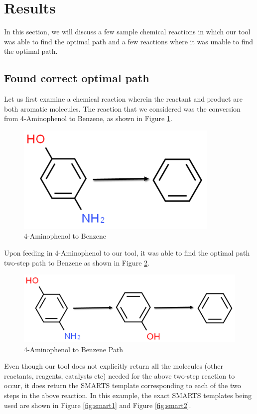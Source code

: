 \documentclass[preprint,12pt]{elsarticle}
\begin{document}
\section{Results}
\label{S:2}

In this section, we will discuss a few sample chemical reactions in which our tool was able to find the optimal path and a few reactions where it was unable to find the optimal path. 

\subsection{Found correct optimal path}

Let us first examine a chemical reaction wherein the reactant and product are both aromatic molecules. The reaction that we considered was the conversion from 4-Aminophenol to Benzene, as shown in Figure \ref{fig:aminophenol_to_benzene}.

\begin{figure}[h]
\centering\includegraphics[width=0.4\linewidth]{aminophenol_to_benzene}
\caption{4-Aminophenol to Benzene}
\label{fig:aminophenol_to_benzene}
\end{figure}

Upon feeding in 4-Aminophenol to our tool, it was able to find the optimal path two-step path to Benzene as shown in Figure \ref{fig:aminophenol_to_benzene_path}.

\begin{figure}[h]
\centering\includegraphics[width=0.6\linewidth]{aminophenol_to_benzene_path}
\caption{4-Aminophenol to Benzene Path}
\label{fig:aminophenol_to_benzene_path}
\end{figure}

Even though our tool does not explicitly return all the molecules (other reactants, reagents, catalysts etc) needed for the above two-step reaction to occur, it does return the SMARTS template corresponding to each of the two steps in the above reaction. In this example, the exact SMARTS templates being used are shown in Figure \ref{fig:smart1} and Figure \ref{fig:smart2}.
\end{document}

